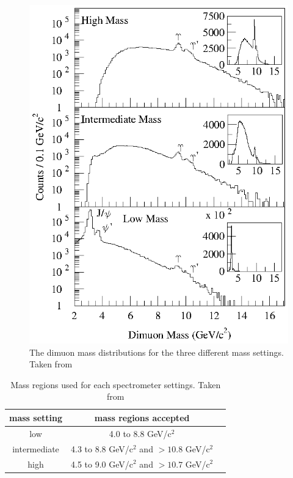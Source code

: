 \documentclass[11pt]{article}
\begin{document}
\begin{figure}
  \begin{center}
  \includegraphics{fig2.eps}
    \vspace*{-0.05in}                                
  \end{center}       
  \caption{The dimuon mass distributions for the three different mass settings. Taken from \cite{Towell:2001nh}}
  \label{fig:3mass}                    
\end{figure}      


\begin{table}
\begin{center}                                                          
\begin{tabular}{ccc}               
 mass setting	 & mass regions accepted    \\ \hline
 low	      & 4.0 to 8.8 \rm{GeV/c$^2$}   \\ 
 intermediate         & 4.3 to 8.8 \rm{GeV/c$^2$} and $> 10.8$ \rm{GeV/c$^2$}   \\
 high  	      & 4.5 to 9.0 \rm{GeV/c$^2$} and $> 10.7$ \rm{GeV/c$^2$} \\
\end{tabular}
\caption{Mass regions used for each spectrometer settings. Taken from \cite{Towell:2001nh}}
\label{tab:massregions}   
\end{center}
\end{table}
\end{document}

